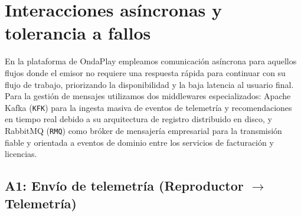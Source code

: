 \section{Interacciones asíncronas y tolerancia a fallos}
\label{sec:asincronas}

En la plataforma de OndaPlay empleamos comunicación asíncrona para aquellos flujos donde el emisor no requiere una respuesta rápida para continuar con su flujo de 
trabajo, priorizando la disponibilidad y la baja latencia al usuario final. Para la gestión de mensajes utilizamos dos middlewares especializados: Apache Kafka (\texttt{KFK}) para la ingesta masiva de eventos de telemetría y recomendaciones
 en tiempo real debido a su arquitectura de registro distribuido en disco, y RabbitMQ (\texttt{RMQ}) como bróker de mensajería empresarial para la transmisión
 fiable y orientada a eventos de dominio entre los servicios de facturación y licencias.

\subsection{A1: Envío de telemetría (Reproductor $\rightarrow$ Telemetría)}
\label{sub:a1}

